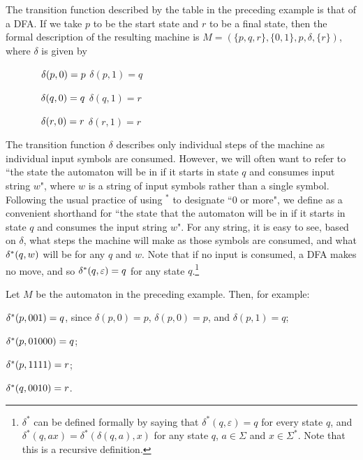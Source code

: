 \begin{example}
The transition function described by the table in the preceding example is that of
a DFA.  
If we take $p$ to be the start state and $r$ to be a final state, then the
formal description  of the resulting machine 
is $M= (\{p,q,r\}, \{0,1\}, p, \delta, \{r\})$, where $\delta$
is given by

\medskip

$\hspace{0.5in}\delta(p,0)=p$ \hspace{1.5in} $\delta(p,1)=q$

$\hspace{0.5in}\delta(q,0)=q$ \hspace{1.5in} $\delta(q,1)=r$

$\hspace{0.5in}\delta(r,0)=r$ \hspace{1.5in} $\delta(r,1)=r$
\end{example}
\smallskip

The transition function $\delta$ describes only individual steps of the machine
as individual input symbols are consumed.  However, we will often want to refer
to
``the
state the automaton will be in if it starts in state $q$ and consumes input
string $w$", where $w$ is a string of input symbols rather than a single symbol.
Following the usual practice of using $^*$ to designate
``0 or more", we define  as a convenient shorthand for 
``the state that the automaton will be in
if it starts in state $q$ and consumes the input string $w$". For any string,
it is easy to see, based on $\delta$, what steps the machine will
make as those symbols are consumed, and what $\delta^*(q,w)$ will be for any $q$
and $w$. Note that if no input is consumed, a DFA makes no move, and so
$\delta^*(q, \varepsilon) = q$ for any state $q$.\footnote{$\delta^*$ can be defined
formally by saying that $\delta^*(q,\varepsilon)=q$ for every state $q$,
and $\delta^*(q,ax)=\delta^*(\delta(q,a),x)$ for any state $q$, $a\in\Sigma$
and $x\in\Sigma^*$.  Note that this is a recursive definition.}

\smallskip

\begin{example}
Let $M$ be the automaton in the preceding example.  Then, for example:

$\delta^*(p, 001)=q$, since $\delta(p,0)=p$, $\delta(p,0)=p$, and $\delta(p,1)=q$; 

$\delta^*(p, 01000)= q$;

$\delta^*(p, 1111) = r$;

$\delta^*(q, 0010) = r$.
\end{example}

